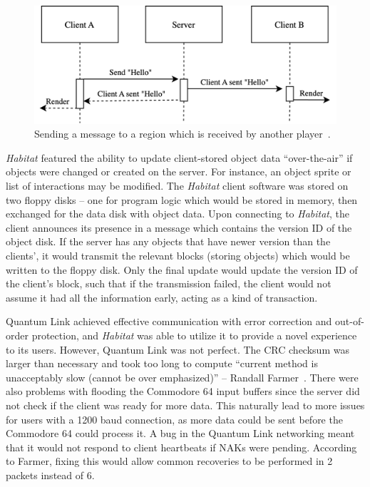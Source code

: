 \begin{figure}[h]
  \includegraphics[width=\columnwidth]{figures/msg}
  \caption{Sending a message to a region which is received by another player~\cite{habitatsrc}.}
  \Description[]{}
\end{figure}

\textit{Habitat} featured the ability to update client-stored object data ``over-the-air'' if objects were changed or created on the server. For instance, an object sprite or list of interactions may be modified. The \textit{Habitat} client software was stored on two floppy disks -- one for program logic which would be stored in memory, then exchanged for the data disk with object data. Upon connecting to \textit{Habitat}, the client announces its presence in a message which contains the version ID of the object disk. If the server has any objects that have newer version than the clients', it would transmit the relevant blocks (storing objects) which would be written to the floppy disk. Only the final update would update the version ID of the client's block, such that if the transmission failed, the client would not assume it had all the information early, acting as a kind of transaction.

Quantum Link achieved effective communication with error correction and out-of-order protection, and \textit{Habitat} was able to utilize it to provide a novel experience to its users. However, Quantum Link was not perfect. The CRC checksum was larger than necessary and took too long to compute ``current method is unacceptably slow (cannot be over emphasized)'' -- Randall Farmer~\cite{habitatsrc}. There were also problems with flooding the Commodore 64 input buffers since the server did not check if the client was ready for more data. This naturally lead to more issues for users with a 1200 baud connection, as more data could be sent before the Commodore 64 could process it. A bug in the Quantum Link networking meant that it would not respond to client heartbeats if NAKs were pending. According to Farmer, fixing this would allow common recoveries to be performed in 2 packets instead of 6.
